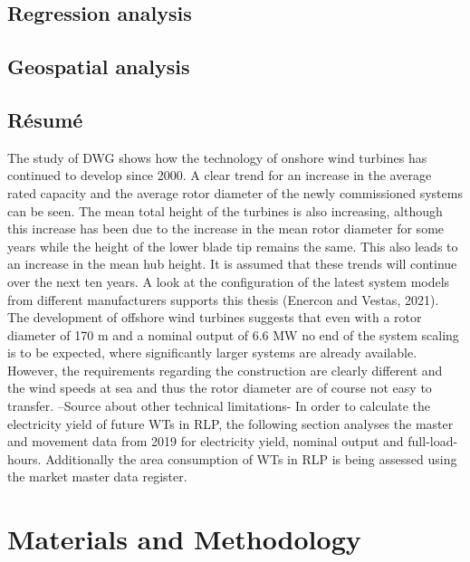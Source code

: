 \documentclass[a4paper,11pt]{article}
\begin{document}
\hypertarget{regression-analysis}{%
\subsection{Regression analysis}\label{regression-analysis}}

\hypertarget{geospatial-analysis}{%
\subsection{Geospatial analysis}\label{geospatial-analysis}}

\hypertarget{ruxe9sumuxe9}{%
\subsection{Résumé}\label{ruxe9sumuxe9}}

The study of DWG shows how the technology of onshore wind turbines has continued to develop since 2000. A clear trend for an increase in the average rated capacity and the average rotor diameter of the newly commissioned systems can be seen. The mean total height of the turbines is also increasing, although this increase has been due to the increase in the mean rotor diameter for some years while the height of the lower blade tip remains the same. This also leads to an increase in the mean hub height. It is assumed that these trends will continue over the next ten years. A look at the configuration of the latest system models from different manufacturers supports this thesis (Enercon and Vestas, 2021). The development of offshore wind turbines suggests that even with a rotor diameter of 170 m and a nominal output of 6.6 MW no end of the system scaling is to be expected, where significantly larger systems are already available. However, the requirements regarding the construction are clearly different and the wind speeds at sea and thus the rotor diameter are of course not easy to transfer. --Source about other technical limitations-
In order to calculate the electricity yield of future WTs in RLP, the following section analyses the master and movement data from 2019 for electricity yield, nominal output and full-load-hours. Additionally the area consumption of WTs in RLP is being assessed using the market master data register.

\hypertarget{materials-and-methodology}{%
\section{Materials and Methodology}\label{materials-and-methodology}}
\end{document}
